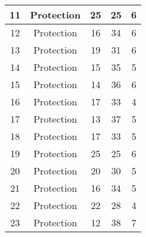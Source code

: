 \documentclass[results.tex]{subfiles}
\begin{document}
\begin{center}
\begin{tabular}{| c || c | c | c | c |}
            \hline
            11                      & Protection                   & 25                     & 25                      & 6                    \\
            \hline
            12                      & Protection                   & 16                     & 34                      & 6                    \\
            \hline
            13                      & Protection                   & 19                     & 31                      & 6                    \\
            \hline
            14                      & Protection                   & 15                     & 35                      & 5                    \\
            \hline
            15                      & Protection                   & 14                     & 36                      & 6                    \\
            \hline
            16                      & Protection                   & 17                     & 33                      & 4                    \\
            \hline
            17                      & Protection                   & 13                     & 37                      & 5                    \\
            \hline
            18                      & Protection                   & 17                     & 33                      & 5                    \\
            \hline
            19                      & Protection                   & 25                     & 25                      & 6                    \\
            \hline
            20                      & Protection                   & 20                     & 30                      & 5                    \\
            \hline
            21                      & Protection                   & 16                     & 34                      & 5                    \\
            \hline
            22                      & Protection                   & 22                     & 28                      & 4                    \\
            \hline
            23                      & Protection                   & 12                     & 38                      & 7                    \\

\end{tabular}
\end{center}
\end{document}
